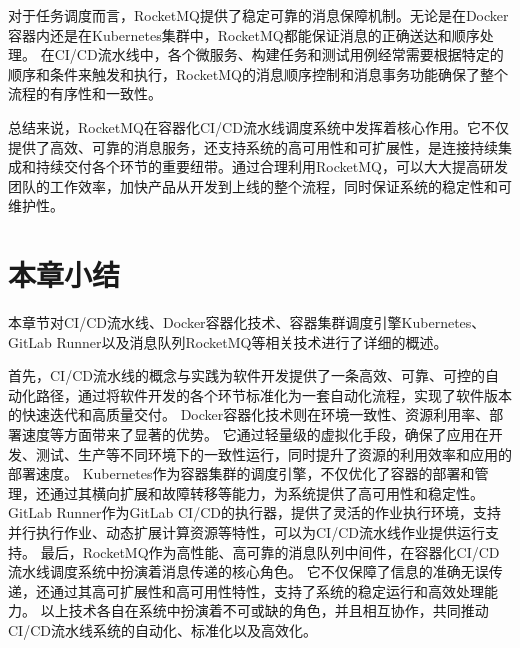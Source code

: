 对于任务调度而言，RocketMQ提供了稳定可靠的消息保障机制。无论是在Docker容器内还是在Kubernetes集群中，RocketMQ都能保证消息的正确送达和顺序处理。
在CI/CD流水线中，各个微服务、构建任务和测试用例经常需要根据特定的顺序和条件来触发和执行，RocketMQ的消息顺序控制和消息事务功能确保了整个流程的有序性和一致性\cite{1018841702.nh}。

总结来说，RocketMQ在容器化CI/CD流水线调度系统中发挥着核心作用。它不仅提供了高效、可靠的消息服务，还支持系统的高可用性和可扩展性，是连接持续集成和持续交付各个环节的重要纽带。通过合理利用RocketMQ，可以大大提高研发团队的工作效率，加快产品从开发到上线的整个流程，同时保证系统的稳定性和可维护性。

\section{本章小结}

本章节对CI/CD流水线、Docker容器化技术、容器集群调度引擎Kubernetes、GitLab Runner以及消息队列RocketMQ等相关技术进行了详细的概述。

首先，CI/CD流水线的概念与实践为软件开发提供了一条高效、可靠、可控的自动化路径，通过将软件开发的各个环节标准化为一套自动化流程，实现了软件版本的快速迭代和高质量交付。
Docker容器化技术则在环境一致性、资源利用率、部署速度等方面带来了显著的优势。
它通过轻量级的虚拟化手段，确保了应用在开发、测试、生产等不同环境下的一致性运行，同时提升了资源的利用效率和应用的部署速度。
Kubernetes作为容器集群的调度引擎，不仅优化了容器的部署和管理，还通过其横向扩展和故障转移等能力，为系统提供了高可用性和稳定性。
GitLab Runner作为GitLab CI/CD的执行器，提供了灵活的作业执行环境，支持并行执行作业、动态扩展计算资源等特性，可以为CI/CD流水线作业提供运行支持。
最后，RocketMQ作为高性能、高可靠的消息队列中间件，在容器化CI/CD流水线调度系统中扮演着消息传递的核心角色。
它不仅保障了信息的准确无误传递，还通过其高可扩展性和高可用性特性，支持了系统的稳定运行和高效处理能力。
以上技术各自在系统中扮演着不可或缺的角色，并且相互协作，共同推动CI/CD流水线系统的自动化、标准化以及高效化。